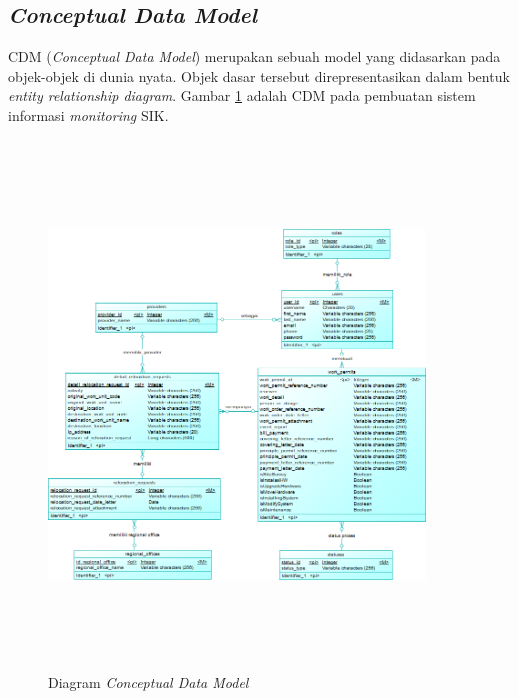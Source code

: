 \subsection{\textit{Conceptual Data Model}}
CDM (\textit{Conceptual Data Model}) merupakan sebuah model yang didasarkan pada objek-objek di dunia nyata. Objek dasar tersebut direpresentasikan dalam bentuk \textit{entity relationship diagram}. Gambar \ref{figure:CDM} adalah CDM pada pembuatan sistem informasi \textit{monitoring} SIK.
	\begin{figure}[h!]
	\centerline
	{\includegraphics[width=10cm,height=14cm]{bab4/CDM.png}}
	\caption{Diagram \textit{Conceptual Data Model}}
	\label{figure:CDM}
	\end{figure}
	
